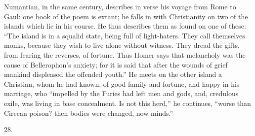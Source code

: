 Numantian, in the same century, describes in verse his
voyage from Rome to Gaul: one book of the poem is extant;
he falls in with Christianity on two of the islands which
lie in his course. He thus describes them as found on one
of these: ``The island is in a squalid state, being
full of light-haters. They call themselves monks, because
they wish to live alone without witness. They dread the
gifts, from fearing the reverses, of fortune. Thus Homer
says that melancholy was the cause of Bellerophon's
anxiety; for it is said that after the wounds of grief
mankind displeased the offended youth.'' He meets on
the other island a Christian, whom he had known, of good
family and fortune, and happy in his marriage, who
``impelled by the Furies had left men and gods, and,
credulous exile, was living in base concealment. Is not
this herd,'' he continues, ``worse than Circean
poison? then bodies were changed, now minds.''

28.

